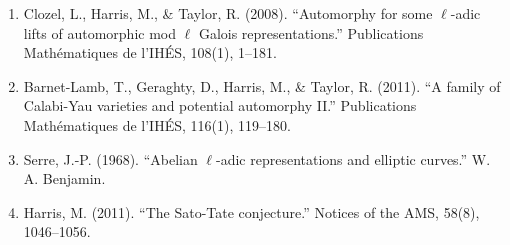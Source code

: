 \begin{enumerate}
\item Clozel, L., Harris, M., \& Taylor, R. (2008). ``Automorphy for some $\ell$-adic lifts of automorphic mod $\ell$ Galois representations.'' Publications Mathématiques de l'IHÉS, 108(1), 1--181.
\item Barnet-Lamb, T., Geraghty, D., Harris, M., \& Taylor, R. (2011). ``A family of Calabi-Yau varieties and potential automorphy II.'' Publications Mathématiques de l'IHÉS, 116(1), 119--180.
\item Serre, J.-P. (1968). ``Abelian $\ell$-adic representations and elliptic curves.'' W. A. Benjamin.
\item Harris, M. (2011). ``The Sato-Tate conjecture.'' Notices of the AMS, 58(8), 1046--1056.
\end{enumerate}
